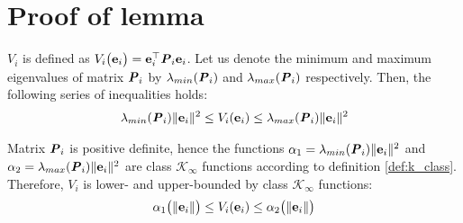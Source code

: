 \section{Proof of lemma }

  $V_i$ is defined as
  $V_i\big(\bm{\mathbf{e}}_i\big) = \bm{\mathbf{e}}_i^{\top} \bm{\mathit{P}}_i \bm{\mathbf{e}}_i$.
  Let us denote the minimum and maximum eigenvalues of matrix $\bm{\mathit{P}}_i$ by
  $\lambda_{min}(\bm{\mathit{P}}_i)$ and $\lambda_{max}(\bm{\mathit{P}}_i)$ respectively.
  Then, the following series of inequalities holds:
\begin{align}
  \lambda_{min}(\bm{\mathit{P}}_i) \|\bm{\mathbf{e}}_i\|^2 \leq V_i(\bm{\mathbf{e}}_i) \leq \lambda_{max}(\bm{\mathit{P}}_i) \|\bm{\mathbf{e}}_i\|^2
\end{align}

Matrix $\bm{\mathit{P}}_i$ is positive definite, hence the functions
$\alpha_1 = \lambda_{min}(\bm{\mathit{P}}_i) \|\bm{\mathbf{e}}_i\|^2$ and
$\alpha_2 = \lambda_{max}(\bm{\mathit{P}}_i) \|\bm{\mathbf{e}}_i\|^2$ are
class $\mathcal{K}_{\infty}$ functions according to definition \eqref{def:k_class}.
Therefore, $V_i$ is lower- and upper-bounded by class $\mathcal{K}_{\infty}$
functions:
\begin{align}
  \alpha_1\big(\|\bm{\mathbf{e}}_i\|\big) \leq V_i(\bm{\mathbf{e}}_i) \leq \alpha_2\big(\| \bm{\mathbf{e}}_i \|\big)
\end{align}
